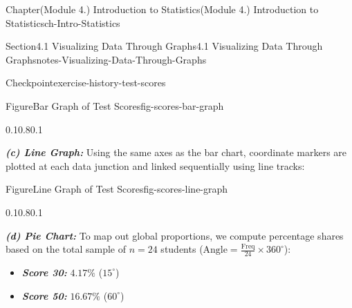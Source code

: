 \documentclass[oneside,10pt,]{book}
\newcommand{\ptxlistdisc}{\raisebox{0.3ex}{\textbullet}}
\newcommand{\alert}[1]{\textbf{\textit{#1}}}
\begin{document}
\begin{chapterptx}{Chapter}{(Module 4.) Introduction to Statistics}{}{(Module 4.) Introduction to Statistics}{}{}{ch-Intro-Statistics}
\begin{sectionptx}{Section}{4.1 Visualizing Data Through Graphs}{}{4.1 Visualizing Data Through Graphs}{}{}{notes-Visualizing-Data-Through-Graphs}
\begin{inlineexercise}{Checkpoint}{}{exercise-history-test-scores}
\begin{figureptx}{Figure}{Bar Graph of Test Scores}{fig-scores-bar-graph}{}%
\begin{image}{0.1}{0.8}{0.1}{}%
%
\end{image}%
\tcblower
\end{figureptx}%
\alert{(c) Line Graph:} Using the same axes as the bar chart, coordinate markers are plotted at each data junction and linked sequentially using line tracks:%
\begin{figureptx}{Figure}{Line Graph of Test Scores}{fig-scores-line-graph}{}%
\begin{image}{0.1}{0.8}{0.1}{}%
%
\end{image}%
\tcblower
\end{figureptx}%
\alert{(d) Pie Chart:} To map out global proportions, we compute percentage shares based on the total sample of \(n = 24\) students (\(\text{Angle} = \frac{\text{Freq}}{24} \times 360^{\circ}\)):%
\par
%
\begin{itemize}[label=\ptxlistdisc]
\item{}\alert{Score 30:} \(4.17\%\) (\(15^{\circ}\))%
\item{}\alert{Score 50:} \(16.67\%\) (\(60^{\circ}\))%

\end{itemize}
\end{inlineexercise}
\end{sectionptx}
\end{chapterptx}
\end{document}
